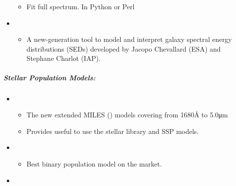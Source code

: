 \documentclass[letterpaper,10pt,english]{sphinxmanual}
\begin{document}
\begin{itemize}
\begin{itemize}
\item {} 
Fit full spectrum. In Python or Perl

\end{itemize}

\item {} 
\begin{itemize}
\item {} 
A new-generation tool to model and interpret galaxy spectral
energy distributions (SEDs) developed by Jacopo Chevallard (ESA)
and Stephane Charlot (IAP).

\end{itemize}

\end{itemize}


\subparagraph{Stellar Population Models:}
\label{\detokenize{resource/astro/topics/stellar_and_spops:stellar-population-models}}\begin{itemize}
\item {} 
\begin{itemize}
\item {} 
The new extended MILES
()
models covering from 1680Å to 5.0μm

\item {} 
Provides useful  to
use the stellar library and SSP models.

\end{itemize}

\item {} 
\begin{itemize}
\item {} 
Best binary population model on the market.

\end{itemize}

\item {} 

\end{itemize}
\end{document}
